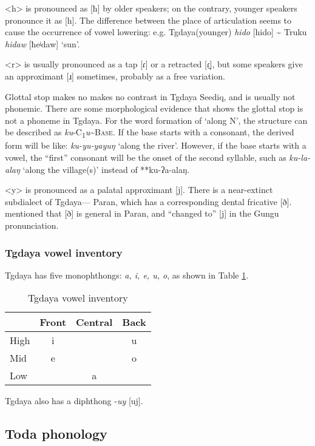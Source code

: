 \documentclass[12pt]{article}
\newcommand{\stgf}{Tgdaya\xspace}
\begin{document}
<h> is pronounced as [ħ] by older speakers; on the contrary, younger speakers pronounce it as [h]. The difference between the place of articulation seems to cause the occurrence of vowel lowering: e.g. \stgf (younger) \textit{hido} [hido] \~{} Truku \textit{hidaw} [ħeʲdaw] `sun'.

<r> is usually pronounced as a tap [ɾ] or a retracted [ɾ̠], but some speakers give an approximant [ɹ] sometimes, probably as a free variation. 

Glottal stop makes no makes no contrast in \stgf Seediq, and is usually not phonemic. There are some morphological evidence that shows the glottal stop is not a phoneme in \stgf. For the word formation of `along N', the structure can be described as \textit{ku}-C\textsubscript{1}\textit{u}\~{ }\textsc{Base}. If the base starts with a consonant, the derived form will be like: \textit{ku-yu-yayuŋ} `along the river'. However, if the base starts with a vowel, the ``first'' consonant will be the onset of the second syllable, such as \textit{ku-la-alaŋ} `along the village(s)' instead of **ku-ʔa-alaŋ. 

<y> is pronounced as a palatal approximant [j]. There is a near-extinct subdialect of \stgf --- Paran, which has a corresponding dental fricative [ð]. \textcite{asai1953sedik} mentioned that  [ð] is general in Paran, and ``changed to'' [j] in the Gungu pronunciation.

\subsubsection{Tgdaya vowel inventory}

\stgf has five monophthongs: \textit{a, i, e, u, o}, as shown in Table \ref{tab:tgV}.

\begin{table}[!htbp]
\centering
\caption{Tgdaya vowel inventory}
\label{tab:tgV}
\begin{tabular}{lccc}
\hline
     & Front & Central & Back \\ \hline
High &  i    &         &  u   \\
Mid  &  e    &         &  o   \\
Low  &       &  a      &      \\ \hline
\end{tabular}
\end{table}

\stgf also has a diphthong -\textit{uy} [uj]. 

\subsection{Toda phonology}
\end{document}
